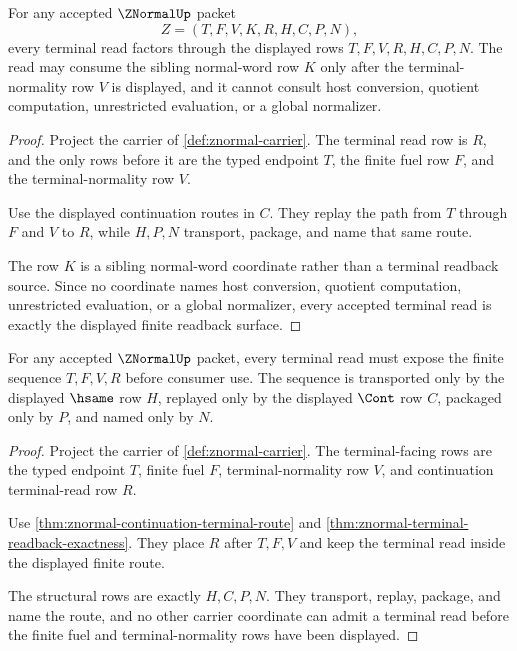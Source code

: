 \begin{theorem}
\label{thm:znormal-terminal-readback-exactness}
For any accepted $\ZNormalUp$ packet
$$
Z=(T,F,V,K,R,H,C,P,N),
$$
every terminal read factors through the displayed rows $T,F,V,R,H,C,P,N$. The read may consume the sibling normal-word row $K$ only after the terminal-normality row $V$ is displayed, and it cannot consult host conversion, quotient computation, unrestricted evaluation, or a global normalizer.
\end{theorem}
\begin{proof}
Project the carrier of \autoref{def:znormal-carrier}. The terminal read row is $R$, and the only rows before it are the typed endpoint $T$, the finite fuel row $F$, and the terminal-normality row $V$.

Use the displayed continuation routes in $C$. They replay the path from $T$ through $F$ and $V$ to $R$, while $H,P,N$ transport, package, and name that same route.

The row $K$ is a sibling normal-word coordinate rather than a terminal readback source. Since no coordinate names host conversion, quotient computation, unrestricted evaluation, or a global normalizer, every accepted terminal read is exactly the displayed finite readback surface.
\end{proof}

\begin{theorem}
\label{thm:znormal-terminal-fuel-route-admission}
For any accepted $\ZNormalUp$ packet, every terminal read must expose the finite sequence $T,F,V,R$ before consumer use. The sequence is transported only by the displayed $\hsame$ row $H$, replayed only by the displayed $\Cont$ row $C$, packaged only by $P$, and named only by $N$.
\end{theorem}
\begin{proof}
Project the carrier of \autoref{def:znormal-carrier}. The terminal-facing rows are the typed endpoint $T$, finite fuel $F$, terminal-normality row $V$, and continuation terminal-read row $R$.

Use \autoref{thm:znormal-continuation-terminal-route} and \autoref{thm:znormal-terminal-readback-exactness}. They place $R$ after $T,F,V$ and keep the terminal read inside the displayed finite route.

The structural rows are exactly $H,C,P,N$. They transport, replay, package, and name the route, and no other carrier coordinate can admit a terminal read before the finite fuel and terminal-normality rows have been displayed.
\end{proof}

